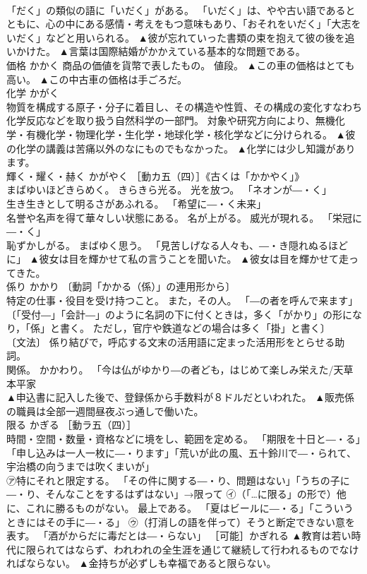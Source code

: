\documentclass[8pt]{extreport}
\begin{document}
\begin{CJK}{UTF8}{min}
\\	「だく」の類似の語に「いだく」がある。 「いだく」は、やや古い語であるとともに、心の中にある感情・考えをもつ意味もあり、「おそれをいだく」「大志をいだく」などと用いられる。	▲彼が忘れていった書類の束を抱えて彼の後を追いかけた。 ▲言葉は国際結婚がかかえている基本的な問題である。
\\	価格	かかく	商品の価値を貨幣で表したもの。 値段。	▲この車の価格はとても高い。 ▲この中古車の価格は手ごろだ。
\\	化学	かがく	
\\	物質を構成する原子・分子に着目し、その構造や性質、その構成の変化すなわち化学反応などを取り扱う自然科学の一部門。 対象や研究方向により、無機化学・有機化学・物理化学・生化学・地球化学・核化学などに分けられる。	▲彼の化学の講義は苦痛以外のなにものでもなかった。 ▲化学には少し知識があります。
\\	輝く・耀く・赫く	かがやく	［動カ五（四）］《古くは「かかやく」》 
\\	まばゆいほどきらめく。 きらきら光る。 光を放つ。 「ネオンが―・く」 
\\	生き生きとして明るさがあふれる。 「希望に―・く未来」 
\\	名誉や名声を得て華々しい状態にある。 名が上がる。 威光が現れる。 「栄冠に―・く」 
\\	恥ずかしがる。 まばゆく思う。 「見苦しげなる人々も、―・き隠れぬるほどに」	▲彼女は目を輝かせて私の言うことを聞いた。 ▲彼女は目を輝かせて走ってきた。
\\	係り	かかり	〔動詞「かかる（係）」の連用形から〕 
\\	特定の仕事・役目を受け持つこと。 また，その人。 「―の者を呼んで来ます」 〔「受付―」「会計―」のように名詞の下に付くときは，多く「がかり」の形になり，「係」と書く。 ただし，官庁や鉄道などの場合は多く「掛」と書く〕 
\\	〔文法〕 係り結びで，呼応する文末の活用語に定まった活用形をとらせる助詞。 
\\	関係。 かかわり。 「今は仏がゆかり―の者ども，はじめて楽しみ栄えた/天草本平家 
\\	▲申込書に記入した後で、登録係から手数料が８ドルだといわれた。 ▲販売係の職員は全部一週間昼夜ぶっ通しで働いた。
\\	限る	かぎる	［動ラ五（四）］ 
\\	時間・空間・数量・資格などに境をし、範囲を定める。 「期限を十日と―・る」「申し込みは一人一枚に―・ります」「荒いが此の風、五十鈴川で―・られて、宇治橋の向うまでは吹くまいが」 
\\	㋐特にそれと限定する。 「その件に関する―・り、問題はない」「うちの子に―・り、そんなことをするはずはない」→限って ㋑（「…に限る」の形で）他に、これに勝るものがない。 最上である。 「夏はビールに―・る」「こういうときにはその手に―・る」 ㋒（打消しの語を伴って）そうと断定できない意を表す。 「酒がからだに毒だとは―・らない」 ［可能］かぎれる	▲教育は若い時代に限られてはならず、われわれの全生涯を通じて継続して行われるものでなければならない。 ▲金持ちが必ずしも幸福であると限らない。

\end{CJK}
\end{document}
